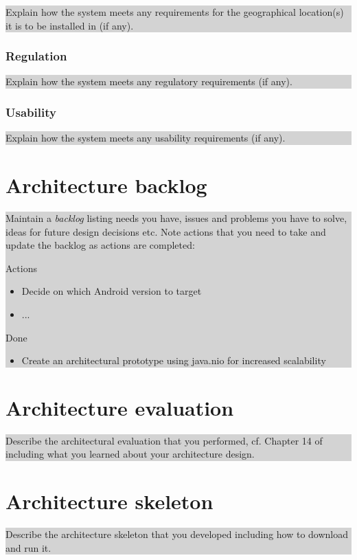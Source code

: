 \documentclass[a4paper,11pt]{report}
\newcommand{\instructions}[1]{
  \noindent\colorbox{lightgray}{%
    \parbox{\linewidth}{%
      #1
    }%
  }%
 \vspace{0.1cm}
}
\begin{document}
\instructions{
Explain how the system meets any requirements for the geographical
location(s) it is to be installed in (if any).
}

\subsection{Regulation}
\label{sec:regulation}

\instructions{
Explain how the system meets any regulatory requirements (if any).
}

\subsection{Usability}
\label{sec:usability}

\instructions{
Explain how the system meets any usability requirements (if any).
}

\appendix

\chapter{Architecture backlog}
\label{cha:architecture-backlog}
\thispagestyle{fancy}

\instructions{ Maintain a \emph{backlog} listing needs you have,
  issues and problems you have to solve, ideas for future design
  decisions etc. Note actions that you need to take and update the
  backlog as actions are completed:

\bigskip
Actions

\begin{itemize}
\item Decide on which Android version to target
\item ...
\end{itemize}

Done

\begin{itemize}
\item Create an architectural prototype using java.nio for increased
  scalability

\end{itemize}


}

\chapter{Architecture evaluation}
\label{cha:arch-eval}
\thispagestyle{fancy}

\instructions{
Describe the architectural evaluation that you performed, cf. Chapter
14 of~\citet{rozanski2011software} including what you learned about
your architecture design.
}

\chapter{Architecture skeleton}
\label{cha:arch-prot}
\thispagestyle{fancy}
\instructions{ 
Describe the architecture skeleton that you developed
  including how to download and run it.
}





% 
% 


\end{document}
